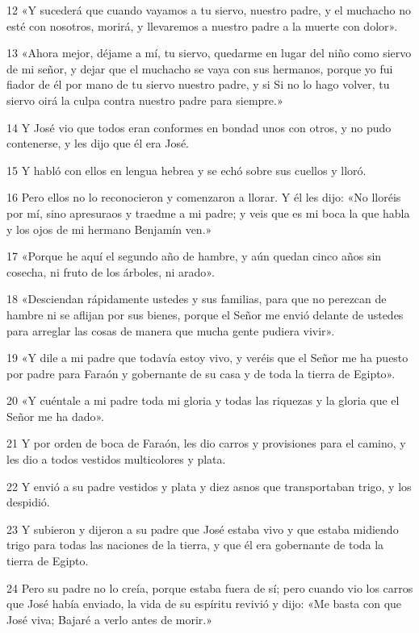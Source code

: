 \par 12 «Y sucederá que cuando vayamos a tu siervo, nuestro padre, y el muchacho no esté con nosotros, morirá, y llevaremos a nuestro padre a la muerte con dolor».
\par 13 «Ahora mejor, déjame a mí, tu siervo, quedarme en lugar del niño como siervo de mi señor, y dejar que el muchacho se vaya con sus hermanos, porque yo fui fiador de él por mano de tu siervo nuestro padre, y si Si no lo hago volver, tu siervo oirá la culpa contra nuestro padre para siempre.»
\par 14 Y José vio que todos eran conformes en bondad unos con otros, y no pudo contenerse, y les dijo que él era José.
\par 15 Y habló con ellos en lengua hebrea y se echó sobre sus cuellos y lloró.
\par 16 Pero ellos no lo reconocieron y comenzaron a llorar. Y él les dijo: «No lloréis por mí, sino apresuraos y traedme a mi padre; y veis que es mi boca la que habla y los ojos de mi hermano Benjamín ven.»
\par 17 «Porque he aquí el segundo año de hambre, y aún quedan cinco años sin cosecha, ni fruto de los árboles, ni arado».
\par 18 «Desciendan rápidamente ustedes y sus familias, para que no perezcan de hambre ni se aflijan por sus bienes, porque el Señor me envió delante de ustedes para arreglar las cosas de manera que mucha gente pudiera vivir».
\par 19 «Y dile a mi padre que todavía estoy vivo, y veréis que el Señor me ha puesto por padre para Faraón y gobernante de su casa y de toda la tierra de Egipto».
\par 20 «Y cuéntale a mi padre toda mi gloria y todas las riquezas y la gloria que el Señor me ha dado».
\par 21 Y por orden de boca de Faraón, les dio carros y provisiones para el camino, y les dio a todos vestidos multicolores y plata.
\par 22 Y envió a su padre vestidos y plata y diez asnos que transportaban trigo, y los despidió.
\par 23 Y subieron y dijeron a su padre que José estaba vivo y que estaba midiendo trigo para todas las naciones de la tierra, y que él era gobernante de toda la tierra de Egipto.
\par 24 Pero su padre no lo creía, porque estaba fuera de sí; pero cuando vio los carros que José había enviado, la vida de su espíritu revivió y dijo: «Me basta con que José viva; Bajaré a verlo antes de morir.»

